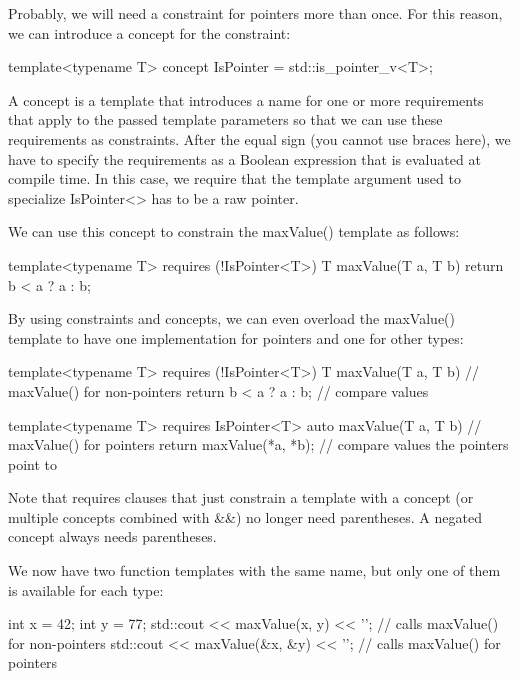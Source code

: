 Probably, we will need a constraint for pointers more than once. For this reason, we can introduce a concept for the constraint:

\begin{cpp}
template<typename T>
concept IsPointer = std::is_pointer_v<T>;
\end{cpp}

A concept is a template that introduces a name for one or more requirements that apply to the passed template parameters so that we can use these requirements as constraints. After the equal sign (you cannot use braces here), we have to specify the requirements as a Boolean expression that is evaluated at compile time. In this case, we require that the template argument used to specialize IsPointer<> has to be a raw pointer.

We can use this concept to constrain the maxValue() template as follows:

\begin{cpp}
template<typename T>
requires (!IsPointer<T>)
T maxValue(T a, T b)
{
	return b < a ? a : b;
}
\end{cpp}


By using constraints and concepts, we can even overload the maxValue() template to have one implementation for pointers and one for other types:

\begin{cpp}
template<typename T>
requires (!IsPointer<T>)
T maxValue(T a, T b) // maxValue() for non-pointers
{
	return b < a ? a : b; // compare values
}

template<typename T>
requires IsPointer<T>
auto maxValue(T a, T b) // maxValue() for pointers
{
	return maxValue(*a, *b); // compare values the pointers point to
}
\end{cpp}

Note that requires clauses that just constrain a template with a concept (or multiple concepts combined with \&\&) no longer need parentheses. A negated concept always needs parentheses.

We now have two function templates with the same name, but only one of them is available for each type:

\begin{cpp}
int x = 42;
int y = 77;
std::cout << maxValue(x, y) << '\n'; // calls maxValue() for non-pointers
std::cout << maxValue(&x, &y) << '\n'; // calls maxValue() for pointers
\end{cpp}

